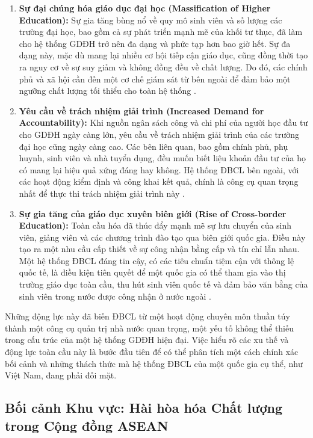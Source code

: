 \documentclass[12pt, a4paper, openany]{report}
\begin{document}
\begin{enumerate}
    \item \textbf{Sự đại chúng hóa giáo dục đại học (Massification of Higher Education):} Sự gia tăng bùng nổ về quy mô sinh viên và số lượng các trường đại học, bao gồm cả sự phát triển mạnh mẽ của khối tư thục, đã làm cho hệ thống GDĐH trở nên đa dạng và phức tạp hơn bao giờ hết. Sự đa dạng này, mặc dù mang lại nhiều cơ hội tiếp cận giáo dục, cũng đồng thời tạo ra nguy cơ về sự suy giảm và không đồng đều về chất lượng. Do đó, các chính phủ và xã hội cần đến một cơ chế giám sát từ bên ngoài để đảm bảo một ngưỡng chất lượng tối thiểu cho toàn hệ thống \cite{Trow2007}.
    
    \item \textbf{Yêu cầu về trách nhiệm giải trình (Increased Demand for Accountability):} Khi nguồn ngân sách công và chi phí của người học đầu tư cho GDĐH ngày càng lớn, yêu cầu về trách nhiệm giải trình của các trường đại học cũng ngày càng cao. Các bên liên quan, bao gồm chính phủ, phụ huynh, sinh viên và nhà tuyển dụng, đều muốn biết liệu khoản đầu tư của họ có mang lại hiệu quả xứng đáng hay không. Hệ thống ĐBCL bên ngoài, với các hoạt động kiểm định và công khai kết quả, chính là công cụ quan trọng nhất để thực thi trách nhiệm giải trình này \cite{Harvey2005}.
    
    \item \textbf{Sự gia tăng của giáo dục xuyên biên giới (Rise of Cross-border Education):} Toàn cầu hóa đã thúc đẩy mạnh mẽ sự lưu chuyển của sinh viên, giảng viên và các chương trình đào tạo qua biên giới quốc gia. Điều này tạo ra một nhu cầu cấp thiết về sự công nhận bằng cấp và tín chỉ lẫn nhau. Một hệ thống ĐBCL đáng tin cậy, có các tiêu chuẩn tiệm cận với thông lệ quốc tế, là điều kiện tiên quyết để một quốc gia có thể tham gia vào thị trường giáo dục toàn cầu, thu hút sinh viên quốc tế và đảm bảo văn bằng của sinh viên trong nước được công nhận ở nước ngoài \cite{Knight2006}.
\end{enumerate}

Những động lực này đã biến ĐBCL từ một hoạt động chuyên môn thuần túy thành một công cụ quản trị nhà nước quan trọng, một yếu tố không thể thiếu trong cấu trúc của một hệ thống GDĐH hiện đại. Việc hiểu rõ các xu thế và động lực toàn cầu này là bước đầu tiên để có thể phân tích một cách chính xác bối cảnh và những thách thức mà hệ thống ĐBCL của một quốc gia cụ thể, như Việt Nam, đang phải đối mặt.

\subsection{Bối cảnh Khu vực: Hài hòa hóa Chất lượng trong Cộng đồng ASEAN}
\label{subsec:boi_canh_khu_vuc}
\end{document}
